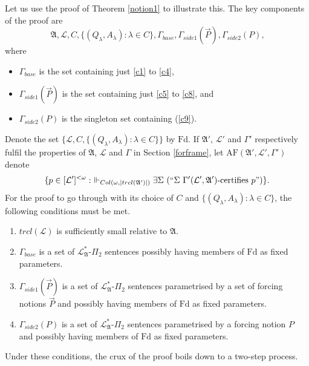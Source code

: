 \documentclass[12pt, twoside]{memoir}
\numberwithin{equation}{section}
\theoremstyle{definition}
\theoremstyle{remark}
\theoremstyle{definition}
\theoremstyle{definition}
\theoremstyle{definition}
\theoremstyle{remark}
\begin{document}
Let us use the proof of Theorem \ref{notion1} to illustrate this. The key components of the proof are 
\begin{equation*}
    \mathfrak{A}, \mathcal{L}, C, \{(Q_{\lambda}, A_{\lambda}) : \lambda \in C\}, \Gamma_{base}, \Gamma_{side1}(\Vec{P}), \Gamma_{side2}(P) \text{,}
\end{equation*}
where 
\begin{itemize}
    \item $\Gamma_{base}$ is the set containing just \ref{c1} to \ref{c4},
    \item $\Gamma_{side1}(\Vec{P})$ is the set containing just \ref{c5} to \ref{c8}, and
    \item $\Gamma_{side2}(P)$ is the singleton set containing (\ref{c9}).
\end{itemize}
Denote the set $\{\mathcal{L}, C, \{(Q_{\lambda}, A_{\lambda}) : \lambda \in C\}\}$ by $\mathrm{Fd}$. If $\mathfrak{A}'$, $\mathcal{L}'$ and $\Gamma'$ respectively fulfil the properties of $\mathfrak{A}$, $\mathcal{L}$ and $\Gamma$ in Section \ref{forframe}, let $\mathrm{AF}(\mathfrak{A}', \mathcal{L}', \Gamma')$ denote
\begin{equation*}
    \{p \in [\mathcal{L}']^{< \omega} : \ \Vdash_{Col(\omega, |trcl(\mathfrak{A}')|)} \exists \Sigma \ (``\Sigma \ \Gamma'(\mathcal{L}', \mathfrak{A}') \text{-certifies } p")\} \text{.}
\end{equation*}
For the proof to go through with its choice of $C$ and $\{(Q_{\lambda}, A_{\lambda}) : \lambda \in C\}$, the following conditions must be met.
\begin{enumerate}[label=(\alph*)]
    \item $trcl(\mathcal{L})$ is sufficiently small relative to $\mathfrak{A}$.
    \item $\Gamma_{base}$ is a set of $\mathcal{L}^*_{\mathfrak{A}}$-$\Pi_2$ sentences possibly having members of $\mathrm{Fd}$ as fixed parameters.
    \item $\Gamma_{side1}(\Vec{P})$ is a set of $\mathcal{L}^*_{\mathfrak{A}}$-$\Pi_2$ sentences parametrised by a set of forcing notions $\Vec{P}$ and possibly having members of $\mathrm{Fd}$ as fixed parameters.
    \item $\Gamma_{side2}(P)$ is a set of $\mathcal{L}^*_{\mathfrak{A}}$-$\Pi_2$ sentences parametrised by a forcing notion $P$ and possibly having members of $\mathrm{Fd}$ as fixed parameters.
\end{enumerate}
Under these conditions, the crux of the proof boils down to a two-step process.
\end{document}
